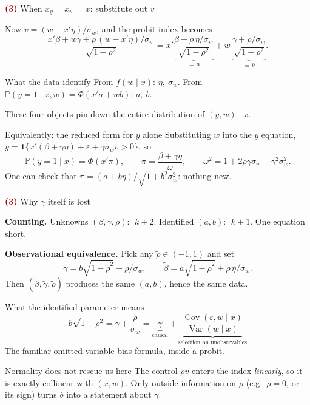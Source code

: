\documentclass[aspectratio=169,11pt]{beamer}
\newcommand{\Pp}{\mathbb{P}}
\newcommand{\ind}{\mathbf{1}}
\newcommand{\Part}[1]{\textcolor{DarkRed}{\textbf{(#1)}}}
\begin{document}
\begin{frame}{\Part{3} When $x_y=x_w=x$: substitute out $v$}

Now $v=(w-x'\eta)/\sigma_w$, and the probit index becomes
\[
\frac{x'\beta + w\gamma + \rho\,(w-x'\eta)/\sigma_w}{\sqrt{1-\rho^2}}
= x'\underbrace{\frac{\beta-\rho\,\eta/\sigma_w}{\sqrt{1-\rho^2}}}_{\equiv\,a}
+ w\,\underbrace{\frac{\gamma+\rho/\sigma_w}{\sqrt{1-\rho^2}}}_{\equiv\,b} .
\]

\pause

\begin{block}{What the data identify}
From $f(w\mid x)$: \;$\eta,\ \sigma_w$.
\qquad
From $\Pp(y=1\mid x,w)=\Phi(x'a+wb)$: \;$a,\ b$.

These four objects pin down the entire distribution of $(y,w)\mid x$.
\end{block}

\pause

\begin{block}{Equivalently: the reduced form for $y$ alone}
Substituting $w$ into the $y$ equation,
$y=\ind\{x'(\beta+\gamma\eta)+\varepsilon+\gamma\sigma_w v>0\}$, so
\[
\Pp(y=1\mid x)=\Phi(x'\pi),\qquad
\pi=\frac{\beta+\gamma\eta}{\omega},\qquad
\omega^2=1+2\rho\gamma\sigma_w+\gamma^2\sigma_w^2 .
\]
One can check that $\pi=(a+b\eta)/\sqrt{1+b^2\sigma_w^2}$: nothing new.
\end{block}

\end{frame}

\begin{frame}{\Part{3} Why $\gamma$ itself is lost}

\textbf{Counting.} Unknowns $(\beta,\gamma,\rho)$: $\;k+2$.
Identified $(a,b)$: $\;k+1$. One equation short.

\pause

\textbf{Observational equivalence.} Pick any $\tilde\rho\in(-1,1)$ and set
\[
\tilde\gamma=b\sqrt{1-\tilde\rho^2}-\tilde\rho/\sigma_w,
\qquad
\tilde\beta=a\sqrt{1-\tilde\rho^2}+\tilde\rho\,\eta/\sigma_w .
\]
Then $(\tilde\beta,\tilde\gamma,\tilde\rho)$ produces the same $(a,b)$, hence the same data.

\pause

\begin{block}{What the identified parameter means}
\[
b\sqrt{1-\rho^2}
=\gamma+\frac{\rho}{\sigma_w}
=\underbrace{\gamma}_{\text{causal}}
+\underbrace{\frac{\operatorname{Cov}(\varepsilon,w\mid x)}{\operatorname{Var}(w\mid x)}}_{\text{selection on unobservables}}
\]
The familiar omitted-variable-bias formula, inside a probit.
\end{block}

\pause

\begin{alertblock}{Normality does not rescue us here}
The control $\rho v$ enters the index \emph{linearly}, so it is exactly
collinear with $(x,w)$. Only outside information on $\rho$ (e.g.\
$\rho=0$, or its sign) turns $b$ into a statement about $\gamma$.
\end{alertblock}

\end{frame}
\end{document}
